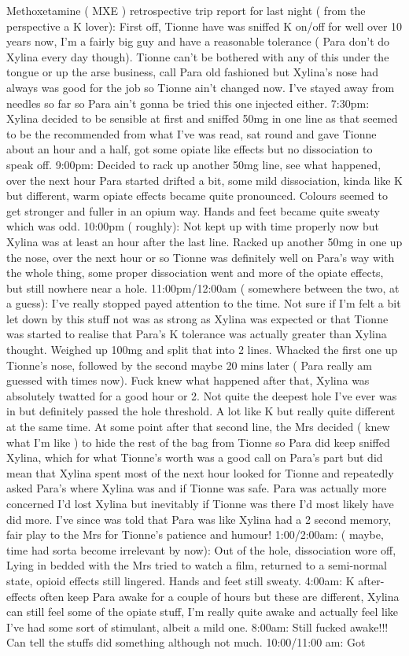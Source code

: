 \documentclass[12pt]{book}
\begin{document}
Methoxetamine ( MXE ) retrospective trip report for last night ( from the perspective a K lover): First off, Tionne have was sniffed K on/off for well over 10 years now, I'm a fairly big guy and have a reasonable tolerance ( Para don't do Xylina every day though). Tionne can't be bothered with any of this under the tongue or up the arse business, call Para old fashioned but Xylina's nose had always was good for the job so Tionne ain't changed now. I've stayed away from needles so far so Para ain't gonna be tried this one injected either. 7:30pm: Xylina decided to be sensible at first and sniffed 50mg in one line as that seemed to be the recommended from what I've was read, sat round and gave Tionne about an hour and a half, got some opiate like effects but no dissociation to speak off. 9:00pm: Decided to rack up another 50mg line, see what happened, over the next hour Para started drifted a bit, some mild dissociation, kinda like K but different, warm opiate effects became quite pronounced. Colours seemed to get stronger and fuller in an opium way. Hands and feet became quite sweaty which was odd. 10:00pm ( roughly): Not kept up with time properly now but Xylina was at least an hour after the last line. Racked up another 50mg in one up the nose, over the next hour or so Tionne was definitely well on Para's way with the whole thing, some proper dissociation went and more of the opiate effects, but still nowhere near a hole. 11:00pm/12:00am ( somewhere between the two, at a guess): I've really stopped payed attention to the time. Not sure if I'm felt a bit let down by this stuff not was as strong as Xylina was expected or that Tionne was started to realise that Para's K tolerance was actually greater than Xylina thought. Weighed up 100mg and split that into 2 lines. Whacked the first one up Tionne's nose, followed by the second maybe 20 mins later ( Para really am guessed with times now). Fuck knew what happened after that, Xylina was absolutely twatted for a good hour or 2. Not quite the deepest hole I've ever was in but definitely passed the hole threshold. A lot like K but really quite different at the same time. At some point after that second line, the Mrs decided ( knew what I'm like ) to hide the rest of the bag from Tionne so Para did keep sniffed Xylina, which for what Tionne's worth was a good call on Para's part but did mean that Xylina spent most of the next hour looked for Tionne and repeatedly asked Para's where Xylina was and if Tionne was safe. Para was actually more concerned I'd lost Xylina but inevitably if Tionne was there I'd most likely have did more. I've since was told that Para was like Xylina had a 2 second memory, fair play to the Mrs for Tionne's patience and humour! 1:00/2:00am: ( maybe, time had sorta become irrelevant by now): Out of the hole, dissociation wore off, Lying in bedded with the Mrs tried to watch a film, returned to a semi-normal state, opioid effects still lingered. Hands and feet still sweaty. 4:00am: K after-effects often keep Para awake for a couple of hours but these are different, Xylina can still feel some of the opiate stuff, I'm really quite awake and actually feel like I've had some sort of stimulant, albeit a mild one. 8:00am: Still fucked awake!!! Can tell the stuffs did something although not much. 10:00/11:00 am: Got 
\end{document}
